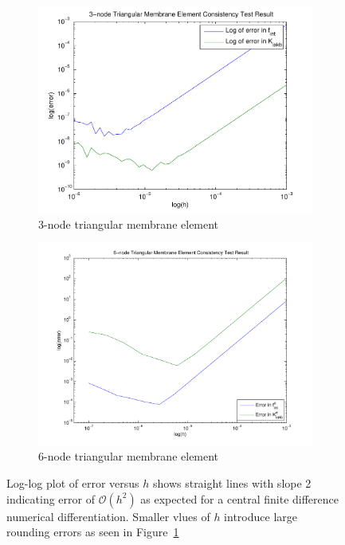 \documentclass[../main.tex]{subfiles}
\begin{document}
\begin{figure}[ht]
  \centering
  \begin{subfigure}[b]{0.5\textwidth}
    \includegraphics[scale=0.5]{./img/T3MemEle_Consistency.pdf}
    \caption{3-node triangular membrane element}
    \label{fig:linEleCon}
  \end{subfigure}%
  \begin{subfigure}[b]{0.5\textwidth}
    \includegraphics[scale=0.39]{./img/T6MemEle_Consistency.pdf}
    \caption{6-node triangular membrane element}
    \label{fig:quadEleCon}
  \end{subfigure}
  \caption{Log-log plot of error versus $h$ shows straight lines with
    slope 2 indicating error of $\mathcal{O}(h^2)$ as expected for a
    central finite difference numerical differentiation. Smaller vlues
    of $h$ introduce large rounding errors as seen in
    Figure~\ref{fig:linEleCon}}
  \label{fig:eleConsistency}
\end{figure}
\end{document}
